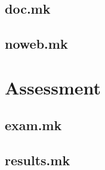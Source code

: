 \documentclass{report}
\begin{document}
\chapter{doc.mk}


\chapter{noweb.mk}


\part{Assessment}

\chapter{exam.mk}


\chapter{results.mk}



\printbibliography{}
\end{document}
